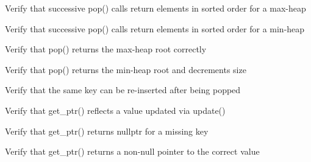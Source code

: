 \begin{DoxyRefList}
%
Verify that successive pop() calls return elements in sorted order for a max-\/heap  
\item[Global \doxylink{test__heap_8cpp_ab660098cf0ad9811d4cb10c4637b0fa1}{TEST\+\_\+F} (\doxylink{classHeapMinTest}{Heap\+Min\+Test}, Successive\+Pops\+Return\+Ascending\+Order)]\label{test__test000284}%
%
Verify that successive pop() calls return elements in sorted order for a min-\/heap  
\item[Global \doxylink{test__heap_8cpp_ae7758031cf445d6105e59c1e5d65a2e5}{TEST\+\_\+F} (\doxylink{classHeapMaxTest}{Heap\+Max\+Test}, Pop\+Returns\+Max\+Root)]\label{test__test000283}%
%
Verify that pop() returns the max-\/heap root correctly  
\item[Global \doxylink{test__heap_8cpp_a8712452b157e91637d079c13403fc769}{TEST\+\_\+F} (\doxylink{classHeapMinTest}{Heap\+Min\+Test}, Pop\+Returns\+Root\+And\+Decrements\+Size)]\label{test__test000282}%
%
Verify that pop() returns the min-\/heap root and decrements size  
\item[Global \doxylink{test__dict_8cpp_aa9736f1309a930934ff93a865dc5965e}{TEST\+\_\+F} (\doxylink{classDictTest}{Dict\+Test}, Pop\+Then\+Reinsert\+Succeeds)]\label{test__test000234}%
%
Verify that the same key can be re-\/inserted after being popped  
\item[Global \doxylink{test__dict_8cpp_aad941eb231f6c1dbbf187b7a31217035}{TEST\+\_\+F} (\doxylink{classDictTest}{Dict\+Test}, Get\+Ptr\+Reflects\+Update\+Change)]\label{test__test000242}%
%
Verify that get\+\_\+ptr() reflects a value updated via update()  
\item[Global \doxylink{test__dict_8cpp_a902a6e3c2fe8e0c4973453855250a24e}{TEST\+\_\+F} (\doxylink{classDictTest}{Dict\+Test}, Get\+Ptr\+Missing\+Key\+Returns\+Nullptr)]\label{test__test000241}%
%
Verify that get\+\_\+ptr() returns nullptr for a missing key  
\item[Global \doxylink{test__dict_8cpp_ad1ac26e942ec898511ad3a8196b5dc5f}{TEST\+\_\+F} (\doxylink{classDictTest}{Dict\+Test}, Get\+Ptr\+Returns\+Correct\+Pointer)]\label{test__test000240}%
%
Verify that get\+\_\+ptr() returns a non-\/null pointer to the correct value  
\item[Global \doxylink{test__dict_8cpp_ad68948777c9e7d2c486a8ae72c87a32c}{TEST\+\_\+F} (\doxylink{classDictTest}{Dict\+Test}, Get\+Non\+Trivial\+Value\+Returns\+Correct\+Value)]\label{test__test000239}%

\end{DoxyRefList}
